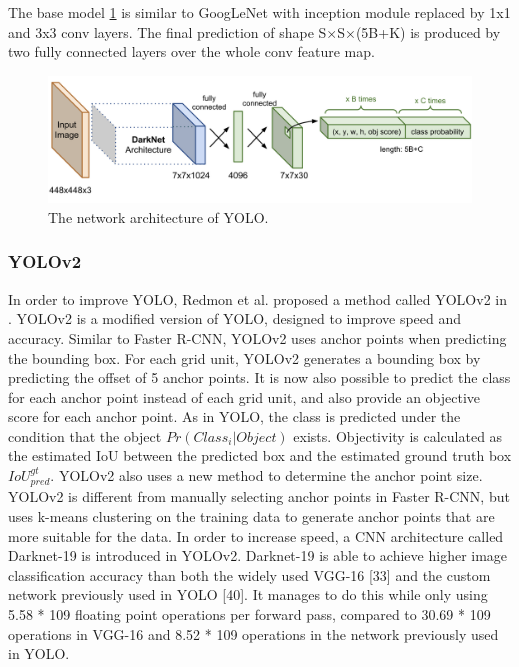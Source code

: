 The base model \ref{fig:yolo-network} is similar to GoogLeNet with inception module replaced by 1x1 and 3x3 conv layers. The final prediction of shape S×S×(5B+K) is produced by two fully connected layers over the whole conv feature map.
\begin{figure}
	\centerline{\includegraphics[width=1\linewidth]{Figs/yolo-network.png}}
	\caption{The network architecture of YOLO.}
	\label{fig:yolo-network}
\end{figure}
\subsubsection{YOLOv2}
In order to improve YOLO, Redmon et al. proposed a method called YOLOv2 in \cite{DBLP:journals/corr/RedmonF16}. YOLOv2 is a modified version of YOLO, designed to improve speed and accuracy.
Similar to Faster R-CNN, YOLOv2 uses anchor points when predicting the bounding box. For each grid unit, YOLOv2 generates a bounding box by predicting the offset of 5 anchor points. It is now also possible to predict the class for each anchor point instead of each grid unit, and also provide an objective score for each anchor point. As in YOLO, the class is predicted under the condition that the object \(Pr(Class_i|Object)\) exists. Objectivity is calculated as the estimated IoU between the predicted box and the estimated ground truth box \(IoU_{pred}^{gt}\). YOLOv2 also uses a new method to determine the anchor point size. YOLOv2 is different from manually selecting anchor points in Faster R-CNN, but uses k-means clustering on the training data to generate anchor points that are more suitable for the data.
In order to increase speed, a CNN architecture called Darknet-19 is introduced in YOLOv2. Darknet-19 is able to achieve higher image classification accuracy than both the widely used VGG-16 [33] and the custom network previously used in YOLO [40]. It manages to do this while only using 5.58 * 109 floating point operations per forward pass, compared to 30.69 * 109 operations in VGG-16 and 8.52 * 109 operations in the network previously used in YOLO.
